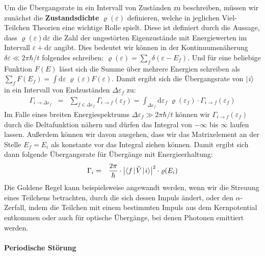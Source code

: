 Um die Übergangsrate in ein Intervall von Zuständen zu beschreiben, müssen wir zunächst die {\bf Zustandsdichte} $\varrho(\varepsilon)$ definieren, welche in jeglichen Viel-Teilchen Theorien eine wichtige Rolle spielt. Diese ist definiert durch die Aussage, dass $\varrho(\varepsilon)\mathrm{d}\varepsilon$ die Zahl der ungestörten Eigenzustände mit Energiewerten im Intervall $\varepsilon+\mathrm{d}\varepsilon$ angibt. Dies bedeutet wir können in der Kontinuumsnäherung $\delta\varepsilon\ll2\pi\hbar/t$ folgendes schreiben: $\varrho(\varepsilon)=\sum_f\delta(\varepsilon - E_f)$. Und für eine beliebige Funktion $F(E)$ lässt sich die Summe über mehrere Energien schreiben als $\sum_f F(E_f) = \int\mathrm{d}\varepsilon\;\varrho(\varepsilon)F(\varepsilon)$. Damit ergibt sich die Übergangsrate von $\mid\!\!\!\,\,{i}\rangle$ in ein Intervall von Endzuständen $\Delta\varepsilon_f$ zu: 
\begin{eqnarray*}
	\Gamma_{i\to\Delta\varepsilon_f} &=& \sum_{f\in\Delta\varepsilon_f} \Gamma_{i\to f}(\varepsilon_f) = \int_{\Delta\varepsilon_f}\mathrm{d}\varepsilon_f\;\varrho(\varepsilon_f)\cdot\Gamma_{i\to f}(\varepsilon_f)
\end{eqnarray*}
Im Falle eines breiten Energiespektrums $\Delta\varepsilon_f\gg2\pi\hbar/t$ können wir $\Gamma_{i\to f}(\varepsilon_f)$ durch die Deltafunktion nähern und dürfen das Integral von $-\infty$ bis $\infty$ laufen lassen. Außerdem können wir davon ausgehen, dass wir das Matrixelement an der Stelle $E_f=E_i$ als konstante vor das Integral ziehen können. Damit ergibt sich dann folgende Übergangsrate für Übergänge mit Energieerhaltung: 
\begin{eqnarray*}
	\Gamma_i &=& \frac{2\pi}{\hbar}\cdot\big|\bracket{f}{\hat{V}}{i}\big|^2 \cdot\varrho(E_i)
\end{eqnarray*}
Die Goldene Regel kann beispielsweise angewandt werden, wenn wir die Streuung eines Teilchens betrachten, durch die sich dessen Impuls ändert, oder den $\alpha$-Zerfall, indem die Teilchen mit einem bestimmten Impuls aus dem Kernpotential entkommen oder auch für optische Übergänge, bei denen Photonen emittiert werden. 


\paragraph{Periodische Störung}

